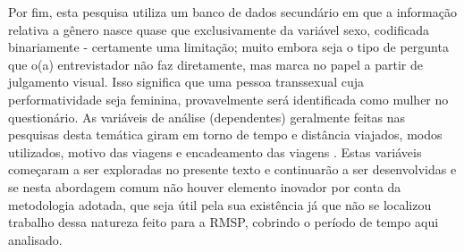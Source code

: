 Por fim, esta pesquisa utiliza um banco de dados secundário em que a informação relativa a gênero nasce quase que exclusivamente da variável sexo, codificada binariamente - certamente uma limitação; muito embora seja o tipo de pergunta que o(a) entrevistador não faz diretamente, mas marca no papel a partir de julgamento visual. Isso significa que uma pessoa transsexual cuja performatividade seja feminina, provavelmente será identificada como mulher no questionário. As variáveis de análise (dependentes) geralmente feitas nas pesquisas desta temática giram em torno de tempo e distância viajados, modos utilizados, motivo das viagens e encadeamento das viagens \cite{HANSON2010}. Estas variáveis começaram a ser exploradas no presente texto e continuarão a ser desenvolvidas e se nesta abordagem comum não houver elemento inovador por conta da metodologia adotada, que seja útil pela sua existência já que não se localizou trabalho dessa natureza feito para a RMSP, cobrindo o período de tempo aqui analisado. 



